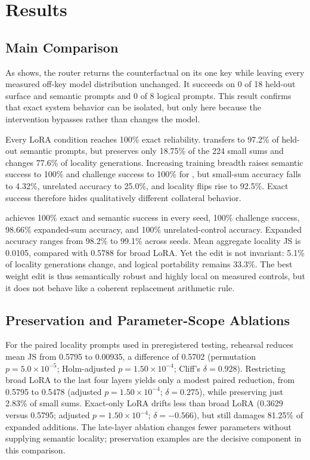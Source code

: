 \section{Results}
\label{sec:results}

\subsection{Main Comparison}



As  shows, the router returns the counterfactual on its one key while leaving every measured off-key model distribution unchanged. It succeeds on 0 of 18 held-out surface and semantic prompts and 0 of 8 logical prompts. This result confirms that exact system behavior can be isolated, but only here because the intervention bypasses rather than changes the model.

Every LoRA condition reaches 100\% exact reliability. \exactlora transfers to 97.2\% of held-out semantic prompts, but preserves only 18.75\% of the 224 small sums and changes 77.6\% of locality generations. Increasing training breadth raises semantic success to 100\% and challenge success to 100\% for \broadlora, but small-sum accuracy falls to 4.32\%, unrelated accuracy to 25.0\%, and locality flips rise to 92.5\%. Exact success therefore hides qualitatively different collateral behavior.

\rehearsallora achieves 100\% exact and semantic success in every seed, 100\% challenge success, 98.66\% expanded-sum accuracy, and 100\% unrelated-control accuracy. Expanded accuracy ranges from 98.2\% to 99.1\% across seeds. Mean aggregate locality JS is 0.0105, compared with 0.5788 for broad LoRA. Yet the edit is not invariant: 5.1\% of locality generations change, and logical portability remains 33.3\%. The best weight edit is thus semantically robust and highly local on measured controls, but it does not behave like a coherent replacement arithmetic rule.

\subsection{Preservation and Parameter-Scope Ablations}

For the paired locality prompts used in preregistered testing, rehearsal reduces mean JS from 0.5795 to 0.00935, a difference of 0.5702 (permutation $p=5.0\times10^{-5}$; Holm-adjusted $p=1.50\times10^{-4}$; Cliff's $\delta=0.928$). Restricting broad LoRA to the last four layers yields only a modest paired reduction, from 0.5795 to 0.5478 (adjusted $p=1.50\times10^{-4}$; $\delta=0.275$), while preserving just 2.83\% of small sums. Exact-only LoRA drifts less than broad LoRA (0.3629 versus 0.5795; adjusted $p=1.50\times10^{-4}$; $\delta=-0.566$), but still damages 81.25\% of expanded additions. The late-layer ablation changes fewer parameters without supplying semantic locality; preservation examples are the decisive component in this comparison.

